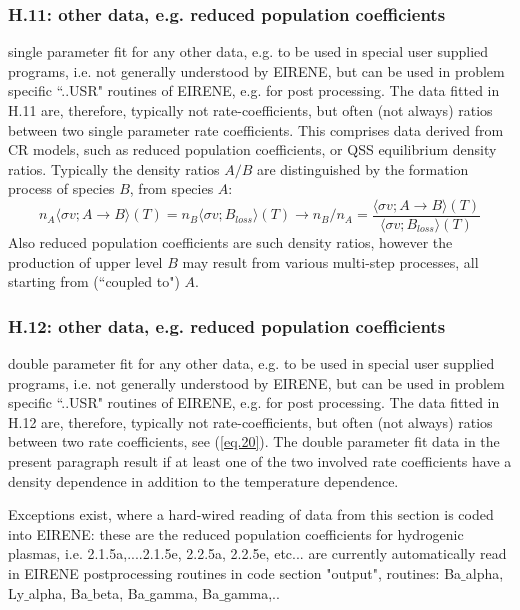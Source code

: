 \documentclass[12pt,dvipdfmx]{article}
\begin{document}
\subsubsection{H.11: other data, e.g. reduced population coefficients}\label{sec1.3.11}
single parameter fit for any other data, e.g.
to be used in special user supplied
programs, i.e. not generally understood by EIRENE, but can be used in problem
specific ``..USR" routines of EIRENE, e.g. for post processing.
The data fitted in H.11 are, therefore, typically not rate-coefficients,
but often (not always) ratios between two single parameter rate coefficients.
This comprises data derived from CR models, such as reduced population coefficients, or
QSS equilibrium density ratios.
Typically the density ratios $A/B$ are distinguished by the formation process
of species $B$, from species $A$:
\begin{equation}\label{eq.20}
n_A \langle \sigma v; A \rightarrow B\rangle(T)  = n_B \langle \sigma v; B_{loss}\rangle(T)    \rightarrow n_B/n_A = \frac{\langle \sigma v; A \rightarrow B\rangle(T)}{\langle \sigma v; B_{loss}\rangle(T)}
\end{equation}
Also reduced population coefficients are such density ratios, however the production of upper level $B$
may result from various multi-step processes, all starting from  (``coupled to") $A$.
\subsubsection{H.12: other data, e.g. reduced population coefficients}\label{sec1.3.12}
double parameter fit for any other data, e.g.
to be used in special user supplied
programs, i.e. not generally understood by EIRENE, but can be used in problem
specific ``..USR" routines of EIRENE, e.g. for post processing.
The data fitted in H.12 are, therefore, typically not rate-coefficients,
but often (not always) ratios between two rate coefficients, see (\ref{eq.20}).
The double parameter fit data in the present paragraph result if at least one of the two
involved rate coefficients have a density dependence in addition to the temperature dependence.




Exceptions exist, where a hard-wired reading of data from this section is coded into EIRENE:
these are the reduced population coefficients for hydrogenic plasmas, i.e.
2.1.5a,....2.1.5e, 2.2.5a, 2.2.5e, etc... are currently automatically read in
EIRENE postprocessing routines in code section "output", routines: Ba$\_$alpha, Ly$\_$alpha, Ba$\_$beta, Ba$\_$gamma, Ba$\_$gamma,..
\end{document}
